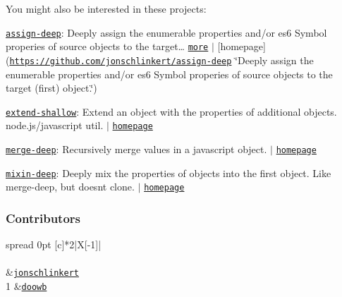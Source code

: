 You might also be interested in these projects\+:


\begin{DoxyItemize}
\item \href{https://www.npmjs.com/package/assign-deep}{\tt assign-\/deep}\+: Deeply assign the enumerable properties and/or es6 Symbol properies of source objects to the target… \href{https://github.com/jonschlinkert/assign-deep}{\tt more} $\vert$ \mbox{[}homepage\mbox{]}(\href{https://github.com/jonschlinkert/assign-deep}{\tt https\+://github.\+com/jonschlinkert/assign-\/deep} \char`\"{}\+Deeply assign the enumerable properties and/or es6 Symbol properies of source objects to the target (first) object.\char`\"{})
\item \href{https://www.npmjs.com/package/extend-shallow}{\tt extend-\/shallow}\+: Extend an object with the properties of additional objects. node.\+js/javascript util. $\vert$ \href{https://github.com/jonschlinkert/extend-shallow}{\tt homepage}
\item \href{https://www.npmjs.com/package/merge-deep}{\tt merge-\/deep}\+: Recursively merge values in a javascript object. $\vert$ \href{https://github.com/jonschlinkert/merge-deep}{\tt homepage}
\item \href{https://www.npmjs.com/package/mixin-deep}{\tt mixin-\/deep}\+: Deeply mix the properties of objects into the first object. Like merge-\/deep, but doesn\textquotesingle{}t clone. $\vert$ \href{https://github.com/jonschlinkert/mixin-deep}{\tt homepage}
\end{DoxyItemize}

\subsubsection*{Contributors}

\tabulinesep=1mm
\begin{longtabu} spread 0pt [c]{*{2}{|X[-1]}|}
\hline
\rowcolor{\tableheadbgcolor}\\
\endfirsthead
\hline
\endfoot
\hline
\rowcolor{\tableheadbgcolor}\\
  &\href{https://github.com/jonschlinkert}{\tt jonschlinkert}   \\
1  &\href{https://github.com/doowb}{\tt doowb}   \\
\end{longtabu}


